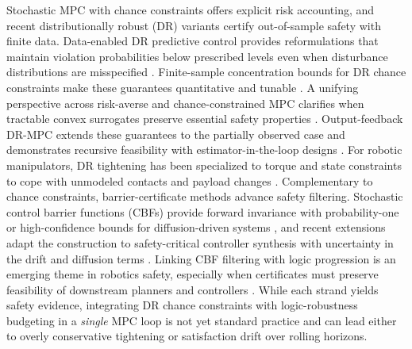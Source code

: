 \documentclass[journal]{IEEEtran}
\theoremstyle{definition}
\begin{document}
 
Stochastic MPC with chance constraints offers explicit risk accounting, and recent distributionally robust (DR) variants certify out-of-sample safety with finite data. Data-enabled DR predictive control provides reformulations that maintain violation probabilities below prescribed levels even when disturbance distributions are misspecified \cite{Coulson2020TAC_DeePC_DR}. Finite-sample concentration bounds for DR chance constraints make these guarantees quantitative and tunable \cite{Han2022TAC_DRCC_MPC}. A unifying perspective across risk-averse and chance-constrained MPC clarifies when tractable convex surrogates preserve essential safety properties \cite{Soudjani2021Automatica_RiskMPC}. Output-feedback DR-MPC extends these guarantees to the partially observed case and demonstrates recursive feasibility with estimator-in-the-loop designs \cite{Zhao2023Automatica_DRMPC_OF}. For robotic manipulators, DR tightening has been specialized to torque and state constraints to cope with unmodeled contacts and payload changes \cite{Yang2024AMechanics_RobotDRMPC}. Complementary to chance constraints, barrier-certificate methods advance safety filtering. Stochastic control barrier functions (CBFs) provide forward invariance with probability-one or high-confidence bounds for diffusion-driven systems \cite{Clark2021Automatica_StochCBF}, and recent extensions adapt the construction to safety-critical controller synthesis with uncertainty in the drift and diffusion terms \cite{Nishimura2024TAC_StochCBF}. Linking CBF filtering with logic progression is an emerging theme in robotics safety, especially when certificates must preserve feasibility of downstream planners and controllers \cite{Cohen2024ARCR_ReducedSafety}. While each strand yields safety evidence, integrating DR chance constraints with logic-robustness budgeting in a \emph{single} MPC loop is not yet standard practice and can lead either to overly conservative tightening or satisfaction drift over rolling horizons.
\end{document}

